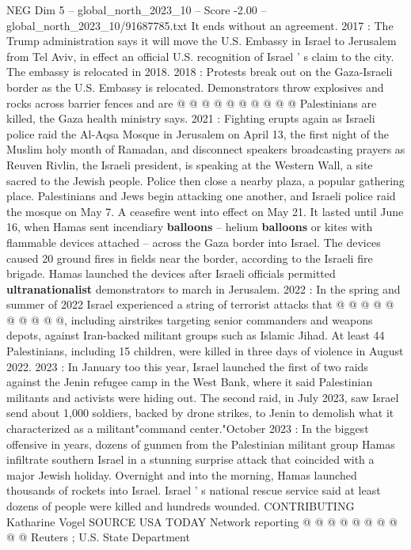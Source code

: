 \begin{textsample}{NEG Dim 5 – global\_north\_2023\_10 – Score -2.00 – global\_north\_2023\_10/91687785.txt}
It ends without an agreement. 2017 : The Trump administration says it will move the U.S.
Embassy in Israel to Jerusalem from Tel Aviv, in effect an official U.S. recognition of Israel ' s claim to the city.
The embassy is relocated in 2018. 2018 : Protests break out on the Gaza-Israeli border as the U.S.
Embassy is relocated.
Demonstrators throw explosives and rocks across barrier fences and are @ @ @ @ @ @ @ @ @ @ Palestinians are killed, the Gaza health ministry says. 2021 : Fighting erupts again as Israeli police raid the Al-Aqsa Mosque in Jerusalem on April 13, the first night of the Muslim holy month of Ramadan, and disconnect speakers broadcasting prayers as Reuven Rivlin, the Israeli president, is speaking at the Western Wall, a site sacred to the Jewish people.
Police then close a nearby plaza, a popular gathering place.
Palestinians and Jews begin attacking one another, and Israeli police raid the mosque on May 7.
A ceasefire went into effect on May 21.
It lasted until June 16, when Hamas sent incendiary \textbf{balloons} -- helium \textbf{balloons} or kites with flammable devices attached -- across the Gaza border into Israel.
The devices caused 20 ground fires in fields near the border, according to the Israeli fire brigade.
Hamas launched the devices after Israeli officials permitted \textbf{ultranationalist} demonstrators to march in Jerusalem. 2022 : In the spring and summer of 2022 Israel experienced a string of terrorist attacks that @ @ @ @ @ @ @ @ @ @, including airstrikes targeting senior commanders and weapons depots, against Iran-backed militant groups such as Islamic Jihad.
At least 44 Palestinians, including 15 children, were killed in three days of violence in August 2022. 2023 : In January too this year, Israel launched the first of two raids against the Jenin refugee camp in the West Bank, where it said Palestinian militants and activists were hiding out.
The second raid, in July 2023, saw Israel send about 1,000 soldiers, backed by drone strikes, to Jenin to demolish what it characterized as a militant"command center."October 2023 : In the biggest offensive in years, dozens of gunmen from the Palestinian militant group Hamas infiltrate southern Israel in a stunning surprise attack that coincided with a major Jewish holiday.
Overnight and into the morning, Hamas launched thousands of rockets into Israel.
Israel ' s national rescue service said at least dozens of people were killed and hundreds wounded.
CONTRIBUTING Katharine Vogel SOURCE USA TODAY Network reporting @ @ @ @ @ @ @ @ @ @ Reuters ; U.S.
State Department

\end{textsample}
